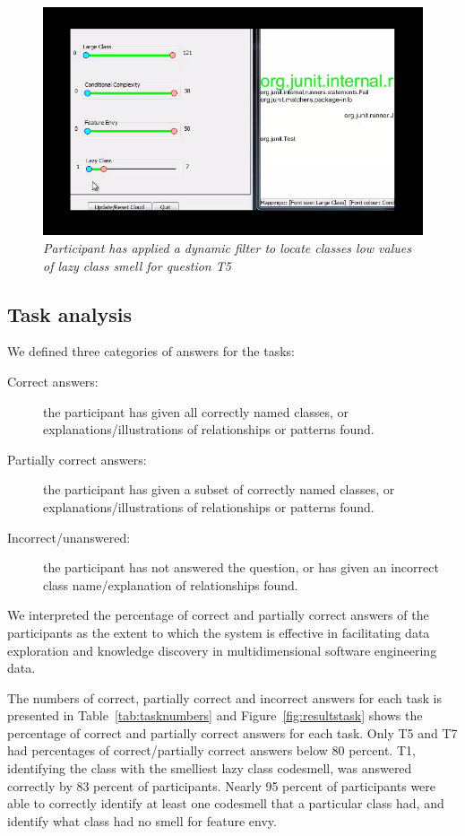 \begin{figure}[!htb]
	\centering
	\includegraphics[scale=0.50]{dynamicfilter.png}
	\caption{\textit{Participant has applied a dynamic filter to locate classes low values of lazy class smell for question T5}}
	\label{fig:dynamicfilter}
\end{figure}


\subsection{Task analysis}

We defined three categories of answers for the tasks:
\begin{description}
\item[Correct answers:] the participant has given all correctly named classes, or explanations/illustrations of  relationships or patterns found.
\item[Partially correct answers:] the participant has given a subset of correctly named classes, or explanations/illustrations of relationships or patterns found.
\item[Incorrect/unanswered:] the participant has not answered the question, or has given an incorrect class name/explanation of relationships found. 
\end{description}

We interpreted the percentage of correct and partially correct answers of the participants as the extent to which the system is effective in facilitating data exploration and knowledge discovery in multidimensional software engineering data.

The numbers of correct, partially correct and incorrect answers for each task is presented in Table~\vref{tab:tasknumbers} and Figure~\vref{fig:resultstask} shows the percentage of correct and partially correct answers for each task. Only T5 and T7 had percentages of correct/partially correct answers below 80 percent. T1, identifying the class with the smelliest lazy class codesmell, was answered correctly by 83 percent of participants. Nearly 95 percent of participants were able to correctly identify at least one codesmell that a particular class had, and identify what class had no smell for feature envy. 


